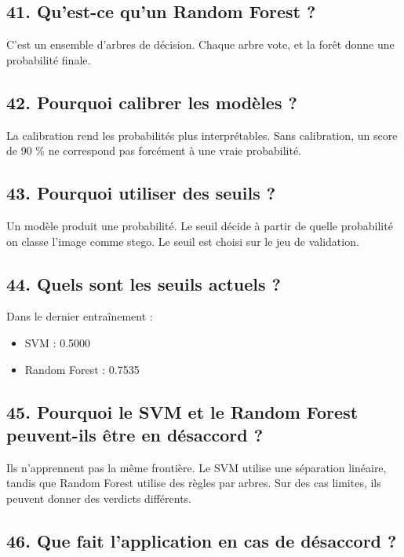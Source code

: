 \documentclass[11pt,a4paper]{article}
\begin{document}
\subsection{41. Qu'est-ce qu'un Random Forest ?}

C'est un ensemble d'arbres de décision. Chaque arbre vote, et la forêt donne une probabilité finale.

\subsection{42. Pourquoi calibrer les modèles ?}

La calibration rend les probabilités plus interprétables. Sans calibration, un score de 90 \% ne correspond pas forcément à une vraie probabilité.

\subsection{43. Pourquoi utiliser des seuils ?}

Un modèle produit une probabilité. Le seuil décide à partir de quelle probabilité on classe l'image comme stego. Le seuil est choisi sur le jeu de validation.

\subsection{44. Quels sont les seuils actuels ?}

Dans le dernier entraînement :

\begin{itemize}
\item SVM : 0.5000
\item Random Forest : 0.7535
\end{itemize}

\subsection{45. Pourquoi le SVM et le Random Forest peuvent-ils être en désaccord ?}

Ils n'apprennent pas la même frontière. Le SVM utilise une séparation linéaire, tandis que Random Forest utilise des règles par arbres. Sur des cas limites, ils peuvent donner des verdicts différents.

\subsection{46. Que fait l'application en cas de désaccord ?}
\end{document}
